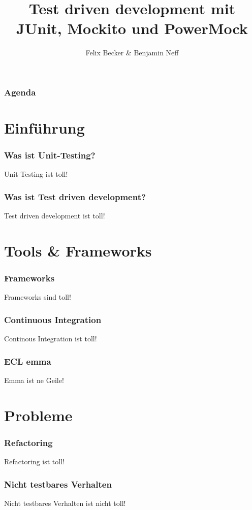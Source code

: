 \documentclass{beamer}
\title{Test driven development mit JUnit, Mockito und PowerMock}
\institute{Computerseminar Tondorf 2011}
\author[F. Becker, B. Neff]{
        Felix Becker \& 
	Benjamin Neff
}
\begin{document}
	\begin{frame}
		\titlepage
	\end{frame}

	\begin{frame}
		\frametitle{Agenda}
		\setcounter{tocdepth}{1}
		\tableofcontents
	\end{frame}
	

	\section{Einführung}
	
		\begin{frame}
			\frametitle{Was ist Unit-Testing?}
			Unit-Testing ist toll!
		\end{frame}

		\begin{frame}
			\frametitle{Was ist Test driven development?}
			Test driven development ist toll!
		\end{frame}

	
	\section{Tools \& Frameworks}
		\begin{frame}
			\frametitle{Frameworks}
			Frameworks sind toll!
		\end{frame}

		\begin{frame}
			\frametitle{Continuous Integration}
			Continous Integration ist toll!
		\end{frame}

		\begin{frame}
			\frametitle{ECL emma}
			Emma ist ne Geile!
		\end{frame}

	
	\section{Probleme}
		\begin{frame}
			\frametitle{Refactoring}
			Refactoring ist toll!
		\end{frame}

		\begin{frame}
			\frametitle{Nicht testbares Verhalten}
			Nicht testbares Verhalten ist nicht toll!
		\end{frame}
\end{document}
